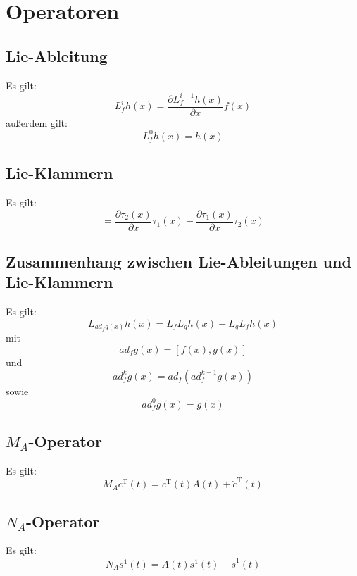 \chapter{Operatoren}
\section{Lie-Ableitung}
Es gilt:
\begin{equation}
    L_f^i h(x) = \frac{\partial L_f^{i-1} h(x)}{\partial x} f(x)
\end{equation}
außerdem gilt:
\begin{equation}
    L_f^0 h(x) = h(x)
\end{equation}

\section{Lie-Klammern}
Es gilt:
\begin{equation}
    [\tau_1(x), \tau_2(x)] = \frac{\partial \tau_2(x)}{\partial x} \tau_1(x) - \frac{\partial \tau_1(x)}{\partial x} \tau_2(x)
\end{equation}

\section{Zusammenhang zwischen Lie-Ableitungen und Lie-Klammern}
Es gilt:
\begin{equation}
    L_{ad_f g(x)} h(x) = L_f L_g h(x) - L_g L_f h(x)
\end{equation}
mit
\begin{equation}
    ad_f g(x) = [f(x), g(x)]
\end{equation}
und
\begin{equation}
    ad_f^k g(x) = ad_f (ad_f^{k-1} g(x))
\end{equation}
sowie
\begin{equation}
    ad_f^0 g(x) = g(x)
\end{equation}

\section{$M_A$-Operator}
Es gilt:
\begin{equation}
    M_A c^\text{T} (t) = c^\text{T} (t) A(t) + \dot{c}^\text{T} (t)
\end{equation}

\section{$N_A$-Operator}
Es gilt:
\begin{equation}
    N_A s^1(t) = A(t) s^1(t) - \dot{s}^1(t)
\end{equation}

